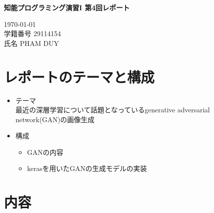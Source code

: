 \documentclass{jarticle}
\begin{document}

\begin{center} 
{\large \bf 知能プログラミング演習I 第4回レポート}
\end{center} %

\begin{flushright} 
\today \\%
\hskip 1mm
学籍番号 %
29114154\\
\hskip 1mm
氏名 %
PHAM DUY
\end{flushright} %

\section{レポートのテーマと構成}
\begin{itemize} 
\item テーマ\\
最近の深層学習について話題となっているgenerative adversarial network(GAN)の画像生成
\item 構成
\begin{itemize}
\item GANの内容
\item kerasを用いたGANの生成モデルの実装
\end{itemize}
\end{itemize}
\section{内容}
\end{document}
